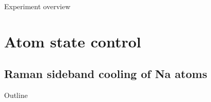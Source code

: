 \documentclass{beamer}
\begin{document}


\begin{frame}{Experiment overview}
\end{frame}

\begin{frame}{}
\end{frame}

\section{Atom state control}
\subsection{Raman sideband cooling of Na atoms}
\begin{frame}{Outline}
  \tableofcontents[currentsection]
\end{frame}

\end{document}
